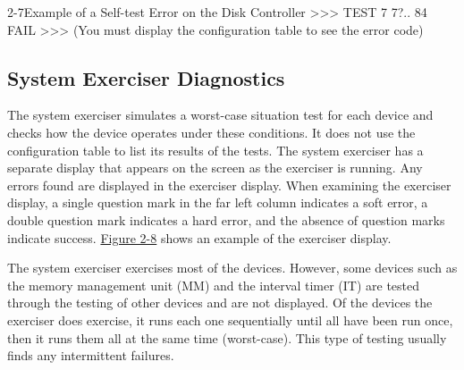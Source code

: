 \newpage 
\begin{ttfig}{2-7}{Example of a Self-test Error on the Disk Controller}
  >>> TEST 7
    7?..
    84 FAIL
  >>>
(You must display the configuration table to see the error code)
\end{ttfig}

\newpage

\subsection{System Exerciser Diagnostics}

The system exerciser simulates a worst-case situation test for each device
and checks how the device operates under these conditions. It does not use
the configuration table to list its results of the tests. The system exerciser
has a separate display that appears on the screen as the exerciser is running.
Any errors found are displayed in the exerciser display. When examining
the exerciser display, a single question mark in the far left column indicates
a soft error, a double question mark indicates a hard error, and the absence
of question marks indicate success. \hyperref[figure:2-8]{Figure 2-8} shows an example of the
exerciser display.

The system exerciser exercises most of the devices. However, some devices
such as the memory management unit (MM) and the interval timer (IT) are
tested through the testing of other devices and are not displayed. Of the
devices the exerciser does exercise, it runs each one sequentially until all
have been run once, then it runs them all at the same time (worst-case).
This type of testing usually finds any intermittent failures.

